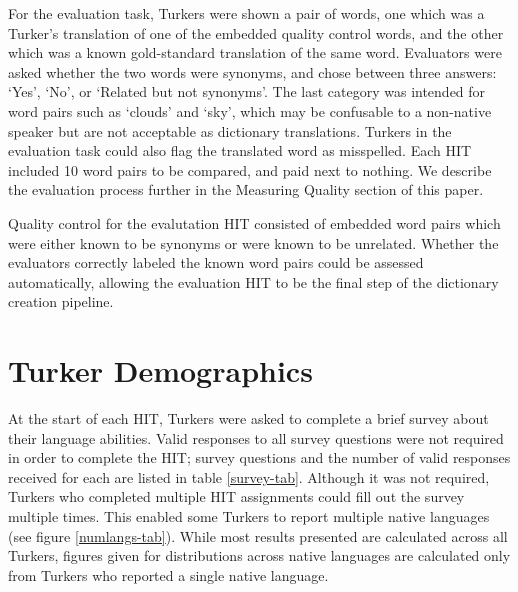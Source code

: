 \documentclass[11pt]{article}
\begin{document}
For the evaluation task, Turkers were shown a pair of words, one which was a Turker's translation of one of the embedded quality control words, and the other which was a known gold-standard translation of the same word. Evaluators were asked whether the two words were synonyms, and chose between three answers: `Yes', `No', or `Related but not synonyms'. The last category was intended for word pairs such as `clouds' and `sky', which may be confusable to a non-native speaker but are not acceptable as dictionary translations. Turkers in the evaluation task could also flag the translated word as misspelled. Each HIT included 10 word pairs to be compared, and paid next to nothing. We describe the evaluation process further in the Measuring Quality section of this paper.

Quality control for the evalutation HIT consisted of embedded word pairs which were either known to be synonyms or were known to be unrelated. Whether the evaluators correctly labeled the known word pairs could be assessed automatically, allowing the evaluation HIT to be the final step of the dictionary creation pipeline.


\section{Turker Demographics}
At the start of each HIT, Turkers were asked to complete a brief survey about their language abilities. Valid responses to all survey questions were not required in order to complete the HIT; survey questions and the number of valid responses received for each are listed in table \ref{survey-tab}. Although it was not required, Turkers who completed multiple HIT assignments could fill out the survey multiple times. This enabled some Turkers to report multiple native languages (see figure \ref{numlangs-tab}). While most results presented are calculated across all Turkers, figures given for distributions across native languages are calculated only from Turkers who reported a single native language.\\
\end{document}
